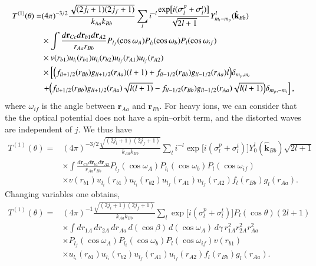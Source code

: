 \begin{equation}\label{eq147}
 \begin{split}
T^{(1)}(\theta)=&(4\pi)^{-3/2}\frac{\sqrt{(2j_i+1)(2j_f+1)}}{k_{Aa}k_{Bb}}\sum_{l}i^{-l}
\frac{\exp\bigl[i(\sigma_{l}^p+\sigma_{l}^t)\bigr]}{\sqrt{2l+1}}Y_{m_t-m_p}^{l}(\hat{\mathbf{k}}_{Bb})\\
 &\times \int \frac{d\mathbf{r}_{Cc}d\mathbf{r}_{b1}d\mathbf{r}_{A2}}{r_{Aa}r_{Bb}}P_{l_f}(\cos\omega_A)P_{l_i}(\cos\omega_b)
 P_{l}(\cos\omega_{if})\\
 &\times  v(r_{b1})u_{l_i}(r_{b1})u_{l_i}(r_{b2})u_{l_f}(r_{A1})u_{l_f}(r_{A2})
\\
 &\times \left[\Bigl(f_{ll+1/2}(r_{Bb})g_{ll+1/2}(r_{Aa})(l+1)+f_{ll-1/2}(r_{Bb})g_{ll-1/2}(r_{Aa})l\Bigr)\delta_{m_p,m_t}\right.\\
  &\left.+\Bigl(f_{ll+1/2}(r_{Bb})g_{ll+1/2}(r_{Aa})\sqrt{l(l+1)}-f_{ll-1/2}(r_{Bb})g_{ll-1/2}(r_{Aa})
  \sqrt{l(l+1)}\Bigr)\delta_{m_p,-m_t}\right],\\
 \end{split}
\end{equation}
where $\omega_{if}$ is the angle between $\mathbf{r}_{Aa}$ and $\mathbf{r}_{Bb}$. For heavy ions, we can consider that the the optical potential does not have a spin--orbit term, and the distorted waves are independent of $j$. We thus have
\begin{equation}\label{eq167}
 \begin{split}
T^{(1)}(\theta)=&(4\pi)^{-3/2}\frac{\sqrt{(2j_i+1)(2j_f+1)}}{k_{Aa}k_{Bb}}\sum_{l}i^{-l}
\exp\bigl[i(\sigma_{l}^p+\sigma_{l}^t)\bigr]Y_{0}^{l}(\hat{\mathbf{k}}_{Bb})\sqrt{2l+1}\\
 &\times \int \frac{d\mathbf{r}_{Cc}d\mathbf{r}_{b1}d\mathbf{r}_{A2}}{r_{Aa}r_{Bb}}P_{l_f}(\cos\omega_A)P_{l_i}(\cos\omega_b)
 P_{l}(\cos\omega_{if})\\
 &\times  v(r_{b1})u_{l_i}(r_{b1})u_{l_i}(r_{b2})u_{l_f}(r_{A1})u_{l_f}(r_{A2})f_{l}(r_{Bb})g_{l}(r_{Aa}).
 \end{split}
\end{equation}
Changing variables one obtains,
\begin{equation}\label{eq168}
 \begin{split}
T^{(1)}(\theta)=&(4\pi)^{-1}\frac{\sqrt{(2j_i+1)(2j_f+1)}}{k_{Aa}k_{Bb}}\sum_{l}
\exp\bigl[i(\sigma_{l}^p+\sigma_{l}^t)\bigr]P_{l}(\cos\theta)(2l+1)\\
 &\times \int dr_{1A}\,dr_{2A}\,dr_{Aa}\,d(\cos\beta)\,d(\cos\omega_A)\,d\gamma \,r_{1A}^2r_{2A}^2r_{Aa}^2 \\ &\times P_{l_f}(\cos\omega_A)P_{l_i}(\cos\omega_b)
 P_{l}(\cos\omega_{if})v(r_{b1})\\
 &\times  u_{l_i}(r_{b1})u_{l_i}(r_{b2})u_{l_f}(r_{A1})u_{l_f}(r_{A2})f_{l}(r_{Bb})g_{l}(r_{Aa}).
 \end{split}
\end{equation}
